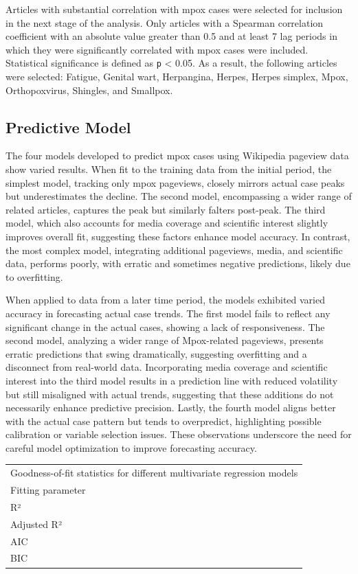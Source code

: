 \documentclass[
  12pt,
]{article}
\begin{document}
Articles with substantial correlation with mpox cases were selected for
inclusion in the next stage of the analysis. Only articles with a
Spearman correlation coefficient with an absolute value greater than 0.5
and at least 7 lag periods in which they were significantly correlated
with mpox cases were included. Statistical significance is defined as
\texttt{p} \textless{} 0.05. As a result, the following articles were
selected: Fatigue, Genital wart, Herpangina, Herpes, Herpes simplex,
Mpox, Orthopoxvirus, Shingles, and Smallpox.~

\subsection{Predictive Model}\label{predictive-model-1}

The four models developed to predict mpox cases using Wikipedia pageview
data show varied results. When fit to the training data from the initial
period, the simplest model, tracking only mpox pageviews, closely
mirrors actual case peaks but underestimates the decline. The second
model, encompassing a wider range of related articles, captures the peak
but similarly falters post-peak. The third model, which also accounts
for media coverage and scientific interest slightly improves overall
fit, suggesting these factors enhance model accuracy. In contrast, the
most complex model, integrating additional pageviews, media, and
scientific data, performs poorly, with erratic and sometimes negative
predictions, likely due to overfitting.~

When applied to data from a later time period, the models exhibited
varied accuracy in forecasting actual case trends. The first model fails
to reflect any significant change in the actual cases, showing a lack of
responsiveness. The second model, analyzing a wider range of
Mpox-related pageviews, presents erratic predictions that swing
dramatically, suggesting overfitting and a disconnect from real-world
data. Incorporating media coverage and scientific interest into the
third model results in a prediction line with reduced volatility but
still misaligned with actual trends, suggesting that these additions do
not necessarily enhance predictive precision. Lastly, the fourth model
aligns better with the actual case pattern but tends to overpredict,
highlighting possible calibration or variable selection issues. These
observations underscore the need for careful model optimization to
improve forecasting accuracy.

\begin{longtable}[]{@{}
  >{\raggedright\arraybackslash}p{}@{}}
\toprule\noalign{}
\endhead
\bottomrule\noalign{}
\endlastfoot
Goodness-of-fit statistics for different multivariate regression
models \\
Fitting parameter \\
R² \\
Adjusted R² \\
AIC \\
BIC \\
\end{longtable}
\end{document}

